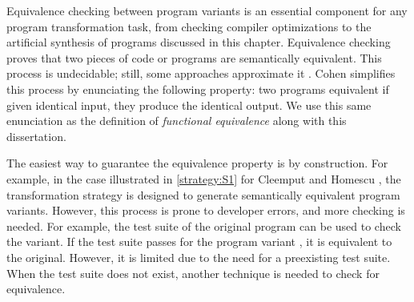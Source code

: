 Equivalence checking between program variants is an essential component for any program transformation task, from checking compiler optimizations \cite{LeCompilers} to the artificial synthesis of programs discussed in this chapter. 
Equivalence checking proves that two pieces of code or programs are semantically equivalent.
This process is undecidable; still, some approaches approximate it \cite{churchill2019}. %
Cohen \cite{cohen1993operating} simplifies this process by enunciating the following property: two programs equivalent if given identical input, they produce the identical output. We use this same enunciation as the definition of \emph{functional equivalence} along with this dissertation. 



The easiest way to guarantee the equivalence property is by construction. For example, in the case illustrated in \autoref{strategy:S1} for Cleemput \etal \cite{Cleemput2012} and Homescu \etal \cite{homescu2013profile}, the transformation strategy is designed to generate semantically equivalent program variants. However, this process is prone to developer errors, and more checking is needed. For example, the test suite of the original program can be used to check the variant. If the test suite passes for the program variant \cite{harrand2020java}, it is equivalent to the original. However, it is limited due to the need for a preexisting test suite. When the test suite does not exist, another technique is needed to check for equivalence.

